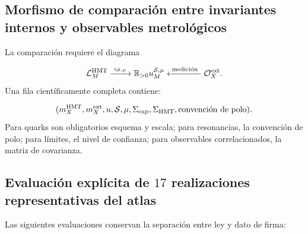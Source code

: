 \subsection{Morfismo de comparación entre invariantes internos y observables metrológicos}
La comparación requiere el diagrama

\[
 \mathcal L_M^{\rm HMT}
 \xrightarrow{\;\varsigma_{\mathcal S,\mu}\;}
 \mathbb R_{>0}u_M^{\mathcal S,\mu}
 \xleftarrow{\;\text{medición}\;}
 \mathcal O_X^{\rm ext}.
\]
Una fila científicamente completa contiene:

\[
 (m_X^{\rm HMT},m_X^{\rm ext},
 u,\mathcal S,\mu,\Sigma_{\rm exp},\Sigma_{\rm HMT},
 \text{convención de polo}).
\]
Para quarks son obligatorios esquema y escala; para resonancias, la convención de polo; para límites, el nivel de confianza; para observables correlacionados, la matriz de covarianza.

\subsection{Evaluación explícita de \(17\) realizaciones representativas del atlas}
Las siguientes evaluaciones conservan la separación entre ley y dato de firma:

